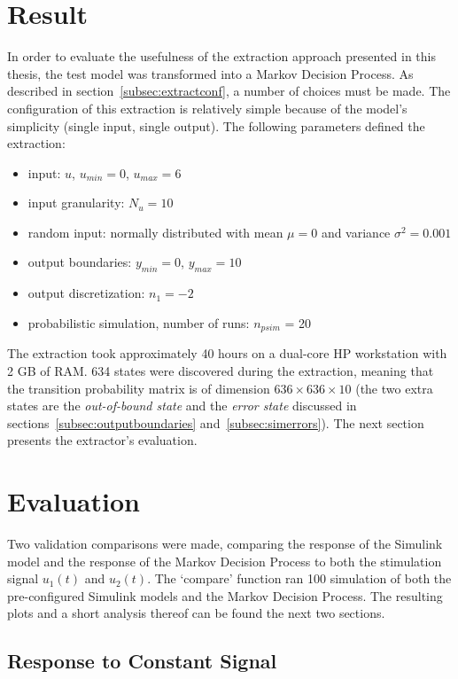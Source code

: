 \section{Result}
\label{sec:resultsextraction}

In order to evaluate the usefulness of the extraction approach presented in this thesis, the test model was transformed into a Markov Decision Process. As described in section~\ref{subsec:extractconf}, a number of choices must be made. The configuration of this extraction is relatively simple because of the model's simplicity (single input, single output). The following parameters defined the extraction:

\begin{itemize}
\item input: $u$, $u_{min} = 0$, $u_{max} = 6$
\item input granularity: $N_{u}=10$
\item random input: normally distributed with mean $\mu=0$ and variance $\sigma^2 = 0.001$
\item output boundaries: $y_{min}=0$, $y_{max}=10$
\item output discretization: $n_1=-2$
\item probabilistic simulation, number of runs: $n_{psim}$ = 20
\end{itemize}

The extraction took approximately 40 hours on a dual-core HP workstation with 2 GB of RAM. 634 states were discovered during the extraction, meaning that the transition probability matrix is of dimension $636\times636\times10$ (the two extra states are the \textit{out-of-bound state} and the \textit{error state} discussed in sections~\ref{subsec:outputboundaries} and~\ref{subsec:simerrors}). The next section presents the extractor's evaluation.

\section{Evaluation}

Two validation comparisons were made, comparing the response of the Simulink model and the response of the Markov Decision Process to both the stimulation signal $u_1(t)$ and $u_2(t)$. The `compare' function ran 100 simulation of both the pre-configured Simulink models and the Markov Decision Process. The resulting plots and a short analysis thereof can be found the next two sections.

\subsection{Response to Constant Signal}
\label{sec:respconst}

